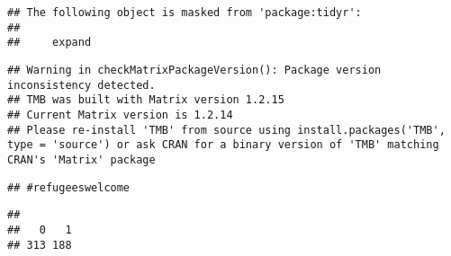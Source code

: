 \documentclass[]{article}
\newenvironment{Shaded}{\begin{snugshade}}{\end{snugshade}}
\newcommand{\KeywordTok}[1]{\textcolor[rgb]{0.13,0.29,0.53}{\textbf{#1}}}
\newcommand{\DataTypeTok}[1]{\textcolor[rgb]{0.13,0.29,0.53}{#1}}
\newcommand{\DecValTok}[1]{\textcolor[rgb]{0.00,0.00,0.81}{#1}}
\newcommand{\StringTok}[1]{\textcolor[rgb]{0.31,0.60,0.02}{#1}}
\newcommand{\CommentTok}[1]{\textcolor[rgb]{0.56,0.35,0.01}{\textit{#1}}}
\newcommand{\OtherTok}[1]{\textcolor[rgb]{0.56,0.35,0.01}{#1}}
\newcommand{\OperatorTok}[1]{\textcolor[rgb]{0.81,0.36,0.00}{\textbf{#1}}}
\newcommand{\NormalTok}[1]{#1}
\begin{document}
\begin{verbatim}
## The following object is masked from 'package:tidyr':
## 
##     expand
\end{verbatim}

\begin{verbatim}
## Warning in checkMatrixPackageVersion(): Package version inconsistency detected.
## TMB was built with Matrix version 1.2.15
## Current Matrix version is 1.2.14
## Please re-install 'TMB' from source using install.packages('TMB', type = 'source') or ask CRAN for a binary version of 'TMB' matching CRAN's 'Matrix' package
\end{verbatim}

\begin{verbatim}
## #refugeeswelcome
\end{verbatim}

\begin{Shaded}
\end{Shaded}

\begin{verbatim}
## 
##   0   1 
## 313 188
\end{verbatim}

\begin{Shaded}
\end{Shaded}
\end{document}

